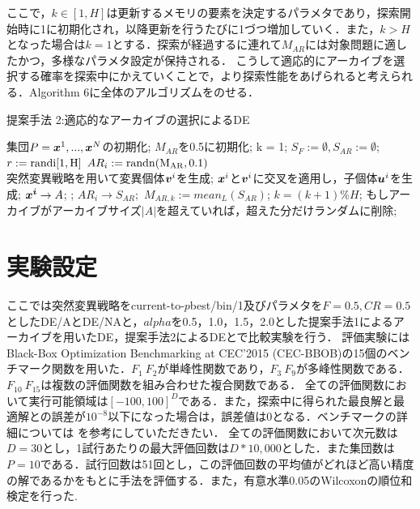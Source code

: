 \documentclass[a4paper,11pt,oneside,openany]{jsbook}
\def\vector#1{\mbox{\boldmath $#1$}}
\begin{document}
ここで，$k \in [1,H]$は更新するメモリの要素を決定するパラメタであり，探索開始時に1に初期化され，以降更新を行うたびに1づつ増加していく．また，$k > H$となった場合は$k = 1$とする．探索が経過するに連れて$M_{AR}$には対象問題に適したかつ，多様なパラメタ設定が保持される．
こうして適応的にアーカイブを選択する確率を探索中にかえていくことで，より探索性能をあげられると考えられる．Algorithm 6に全体のアルゴリズムをのせる．

\begin{algorithm}
\caption{提案手法 2:適応的なアーカイブの選択によるDE}
\label{alg:pbnf}
\begin{algorithmic}
\STATE 集団$P={\vector{x}^1,...,\vector{x}^N}$の初期化;
\STATE $M _{AR}$を0.5に初期化;
\STATE k = 1;
    \STATE $S_F := \emptyset, S_{AR} := \emptyset$;
        \STATE $r := \rm{randi}[1,H]$
        \STATE $AR_i := \rm{randn}(M_{AR}, 0.1)$ \\
        \STATE 突然変異戦略を用いて変異個体{$\vector{v}^i$}を生成;
        \STATE $\vector{x}^i$と$\vector{v}^i$に交叉を適用し，子個体$\vector{u}^i$を生成;
     \ENDFOR
        \IF {$f(\vector{u}^i) \leqq f(\vector{x}^i)$}
            \STATE $\vector{x^i} \rightarrow {A}$;
            \STATE {$\vector{x}^i=\vector{u}^i$};
            \STATE $AR_i \rightarrow S_{AR};$
        \ENDIF
    \ENDFOR
        \STATE $M_{AR,k}  :=  mean_L(S_{AR})$;
        \STATE $k = (k+1) \% H$;
    \ENDIF
    \STATE もしアーカイブがアーカイブサイズ$|A|$を超えていれば，超えた分だけランダムに削除;
\ENDWHILE
\end{algorithmic}
\end{algorithm}

\section{実験設定}
ここでは突然変異戦略をcurrent-to-$p$best/bin/1及びパラメタを$F=0.5,CR=0.5$としたDE/AとDE/NAと，$alpha$を0.5，1.0，1.5，2.0とした提案手法1によるアーカイブを用いたDE，提案手法2によるDEとで比較実験を行う．
評価実験にはBlack-Box Optimization Benchmarking at CEC'2015 (CEC-BBOB)の15個のベンチマーク関数を用いた．$F_{1}~F_{2}$が単峰性関数であり，$F_3~F_9$が多峰性関数である．$F_{10}~F_{15}$は複数の評価関数を組み合わせた複合関数である．
全ての評価関数において実行可能領域は$[-100,100]^D$である．また，探索中に得られた最良解と最適解との誤差が$10^{-8}$以下になった場合は，誤差値は0となる．ベンチマークの詳細については \cite{CEC2015} を参考にしていただきたい．
全ての評価関数において次元数は$D=30$とし，1試行あたりの最大評価回数は$D*10,000$とした．また集団数は$P=10$である．試行回数は51回とし，この評価回数の平均値がどれほど高い精度の解であるかをもとに手法を評価する．また，有意水準0.05のWilcoxonの順位和検定を行った.
\end{document}
